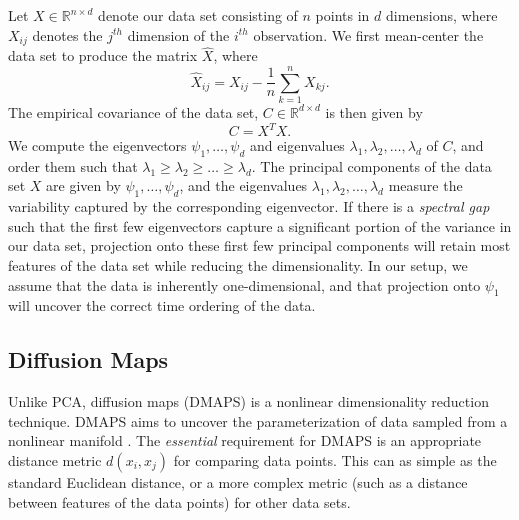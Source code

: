 \documentclass[10pt]{article}
\begin{document}
Let $X \in \mathbb{R}^{n \times d}$ denote our data set consisting of $n$ points in $d$ dimensions, where $X_{ij}$ denotes the $j^{th}$ dimension of the $i^{th}$ observation. 
%
We first mean-center the data set to produce the matrix $\hat{X}$, where
\begin{equation}
\hat{X}_{ij} = X_{ij} - \frac{1}{n} \sum_{k=1}^n X_{kj}.
\end{equation}
%
The empirical covariance of the data set, $C \in \mathbb{R}^{d \times d}$ is then given by
\begin{equation}
C = X^T X.
\end{equation}
%
We compute the eigenvectors $\psi_1, \dots, \psi_d$ and eigenvalues $\lambda_1, \lambda_2, \dots, \lambda_d$ of $C$, and order them such that $\lambda_1 \ge \lambda_2 \ge \dots \ge \lambda_d$.
%
The principal components of the data set $X$ are given by $\psi_1, \dots, \psi_d$, and the eigenvalues $\lambda_1, \lambda_2, \dots, \lambda_d$ measure the variability captured by the corresponding eigenvector. 
%
If there is a {\em spectral gap} such that the first few eigenvectors capture a significant portion of the variance in our data set, projection onto these first few principal components will retain most features of the data set while reducing the dimensionality.
%
In our setup, we assume that the data is inherently one-dimensional, and that projection onto $\psi_1$ will uncover the correct time ordering of the data.

\subsection*{Diffusion Maps}
Unlike PCA, diffusion maps (DMAPS) is a nonlinear dimensionality reduction technique. 
%
DMAPS aims to uncover the parameterization of data sampled from a nonlinear manifold \cite{coifman2005geometric}.
%
The {\em essential} requirement for DMAPS is an appropriate distance metric $d(x_i, x_j)$ for comparing data points. 
%
This can as simple as the standard Euclidean distance, or a more complex metric (such as a distance between features of the data points) for other data sets.
\end{document}
